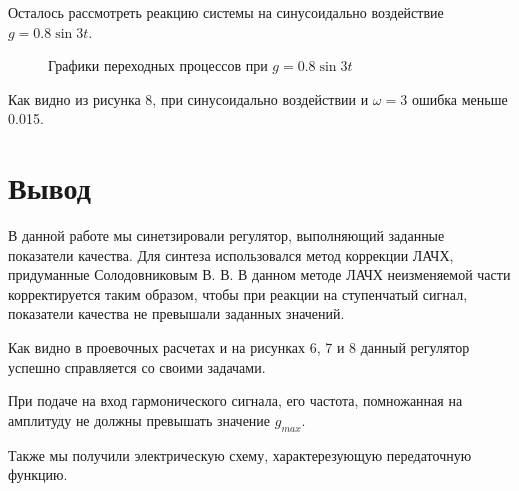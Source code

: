 \documentclass[russian, utf8]{eskdtext}
\begin{document}
Осталось рассмотреть реакцию системы на синусоидально воздействие $g = 0.8\sin{3t}$.
\begin{figure}[h!]
    \begin{subfigure} {0.5\textwidth}
    \end{subfigure}
    \begin{subfigure} {0.5\textwidth}
    \end{subfigure}
    \caption{Графики переходных процессов при $g = 0.8\sin{3t}$}
\end{figure}
Как видно из рисунка 8, при синусоидально воздействии и $\omega = 3$ ошибка меньше 0.015.

\newpage
\section*{Вывод}
В данной работе мы синетзировали регулятор, выполняющий заданные показатели качества. Для синтеза использовался метод коррекции ЛАЧХ, придуманные Солодовниковым В. В. В данном методе ЛАЧХ неизменяемой части корректируется таким образом, чтобы при реакции на ступенчатый сигнал, показатели качества не превышали заданных значений. \par
Как видно в проевочных расчетах и на рисунках 6, 7 и 8 данный регулятор успешно справляется со своими задачами. \par
При подаче на вход гармонического сигнала, его частота, помножанная на амплитуду не должны превышать значение $g_{max}$. \par
Также мы получили электрическую схему, характерезующую передаточную функцию.
\end{document}
